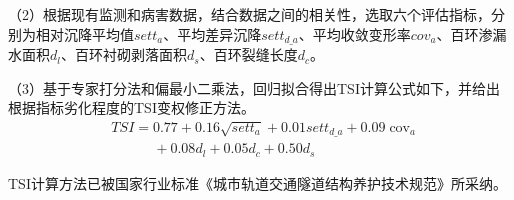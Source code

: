 （2）根据现有监测和病害数据，结合数据之间的相关性，选取六个评估指标，分别为相对沉降平均值${sett}_{a}$、平均差异沉降$set{{t}_{d\_a}}$、平均收敛变形率${cov}_{a}$、百环渗漏水面积${d}_{l}$、百环衬砌剥落面积${d}_{s}$、百环裂缝长度${d}_{c}$。

（3）基于专家打分法和偏最小二乘法，回归拟合得出TSI计算公式如下，并给出根据指标劣化程度的TSI变权修正方法。
\begin{align}
  & TSI=0.77+0.16\sqrt{set{{t}_{a}}}+0.01set{{t}_{d\_a}}+0.09{{\operatorname{cov}}_{a}} \nonumber \\ 
 & \quad \quad \quad +0.08{{d}_{l}}+0.05{{d}_{c}}+0.50{{d}_{s}} \nonumber 
\end{align}

TSI计算方法已被国家行业标准《城市轨道交通隧道结构养护技术规范》所采纳。

